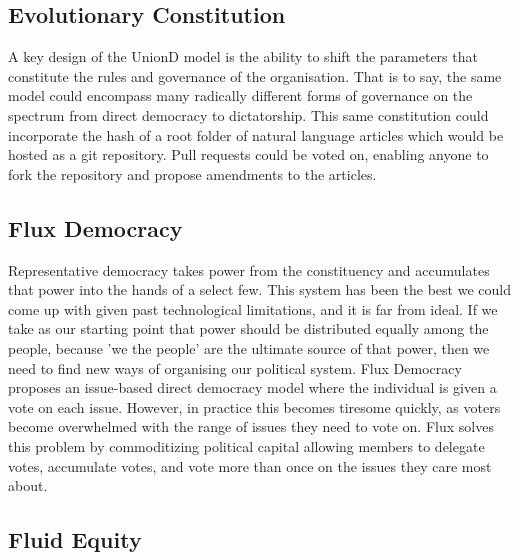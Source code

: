 \documentclass[12pt,twocolumn]{article}
\begin{document}
\subsection {Evolutionary Constitution}

A key design of the UnionD model is the ability to shift the parameters that constitute the rules and governance of the organisation. That is to say, the same model could encompass many radically different forms of governance on the spectrum from direct democracy to dictatorship. This same constitution could incorporate the hash of a root folder of natural language articles which would be hosted as a git repository. Pull requests could be voted on, enabling anyone to fork the repository and propose amendments to the articles.

\subsection {Flux Democracy}

Representative democracy takes power from the constituency and accumulates that power into the hands of a select few. This system has been the best we could come up with given past technological limitations, and it is far from ideal. If we take as our starting point that power should be distributed equally among the people, because 'we the people' are the ultimate source of that power, then we need to find new ways of organising our political system.  Flux Democracy proposes an issue-based direct democracy model where the individual is given a vote on each issue. However, in practice this becomes tiresome quickly, as voters become overwhelmed with the range of issues they need to vote on. Flux solves this problem by commoditizing political capital allowing members to delegate votes, accumulate votes, and vote more than once on the issues they care most about.

\subsection {Fluid Equity}
\end{document}

